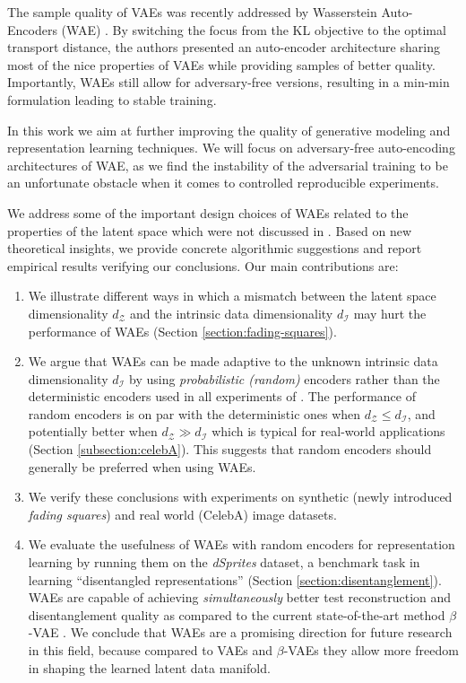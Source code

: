\documentclass{article}
\def\dZ{d_{\mathcal{Z}}}
\def\dP{d_{\mathcal{I}}}
\def\Z{\mathcal{Z}}
\begin{document}
The sample quality of VAEs was recently addressed by Wasserstein Auto-Encoders (WAE) \cite{TBG+17}.
By switching the focus from the KL objective to the optimal transport distance, the authors presented an auto-encoder architecture sharing most of the nice properties of VAEs while providing samples of better quality.
Importantly, WAEs still allow for adversary-free versions, resulting in a min-min formulation leading to stable training.

In this work we aim at further improving the quality of generative modeling and representation learning techniques.
We will focus on adversary-free auto-encoding architectures of WAE, as we find the instability of the adversarial training to be an unfortunate obstacle when it comes to controlled reproducible experiments.

We address some of the important design choices of WAEs related to the properties of the latent space which were not discussed in \cite{TBG+17}.
Based on new theoretical insights, we provide concrete algorithmic suggestions and report empirical results verifying our conclusions.
Our main contributions are:
\vspace{-.35cm}
\begin{enumerate}
\item
We illustrate different ways in which a mismatch between the latent space dimensionality $\dZ$ and the intrinsic data dimensionality $\dP$ may hurt the performance of WAEs (Section \ref{section:fading-squares}).
\item
We argue that WAEs can be made adaptive to the unknown intrinsic data dimensionality $\dP$ by using \emph{probabilistic (random)} encoders rather than the deterministic encoders used in all experiments of \citet{TBG+17}.
The performance of random encoders is on par with the deterministic ones when $d_{\Z} \leq \dP$, and potentially better when $d_{\Z} \gg \dP$ which is typical for real-world applications (Section \ref{subsection:celebA}). 
This suggests that random encoders should generally be preferred when using WAEs.
\item
We verify these conclusions with experiments on synthetic (newly introduced \emph{fading squares}) and real world (CelebA) image datasets.
\item
We evaluate the usefulness of WAEs with random encoders for representation learning by running them on the \emph{dSprites} dataset, a benchmark task in learning ``disentangled representations'' (Section \ref{section:disentanglement}).
WAEs are capable of achieving \emph{simultaneously} better test reconstruction and disentanglement quality as compared to the current state-of-the-art method $\beta$-VAE \cite{HM+17}.
We conclude that WAEs are a promising direction for future research in this field, because compared to VAEs and $\beta$-VAEs they allow more freedom in shaping the learned latent data manifold.
\end{enumerate}
\end{document}
